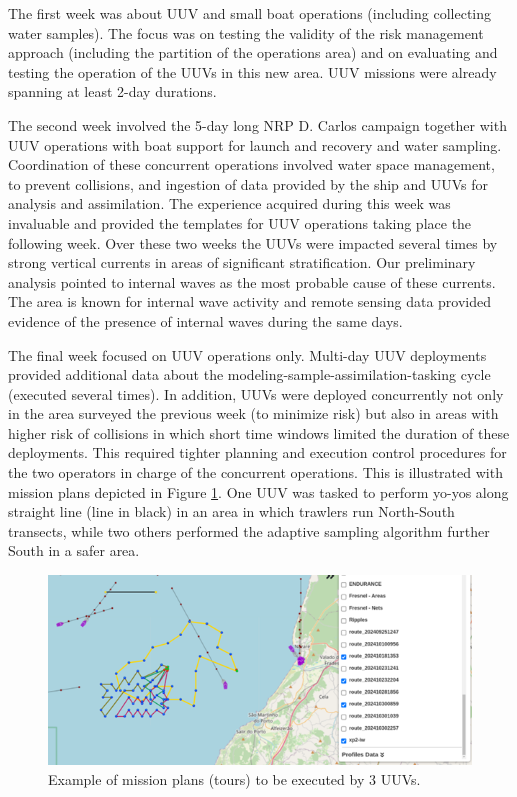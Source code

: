 The first week was about UUV and small boat operations (including collecting water samples). The focus was on testing the validity of the risk management approach (including the partition of the operations area) and on evaluating and testing the operation of the UUVs in this new area. UUV missions were already spanning at least 2-day durations.

The second week involved the 5-day long NRP D. Carlos campaign together with UUV operations with boat support for launch and recovery and water sampling. Coordination of these concurrent operations involved water space management, to prevent collisions, and ingestion of data provided by the ship and UUVs for analysis and assimilation. The experience acquired during this week was invaluable and provided the templates for UUV operations taking place the following week. Over these two weeks the UUVs were impacted several times by strong vertical currents in areas of significant stratification. Our preliminary analysis pointed to internal waves as the most probable cause of these currents. The area is known for internal wave activity and remote sensing data provided evidence of the presence of internal waves during the same days. 

The final week focused on UUV operations only. Multi-day UUV deployments provided additional data about the modeling-sample-assimilation-tasking cycle (executed several times). In addition, UUVs were deployed concurrently not only in the area surveyed the previous week (to minimize risk) but also in areas with higher risk of collisions in which short time windows limited the duration of these deployments. This required tighter planning and execution control procedures for the two operators in charge of the concurrent operations. This is illustrated with mission plans depicted in Figure \ref{fig:missionplans}. One UUV was tasked to perform yo-yos along straight line (line in black) in an area in which trawlers run North-South transects, while two others performed the adaptive sampling algorithm further South in a safer area.
 
\begin{figure}
    \centering
    \includegraphics[width=.7\linewidth]{fig/missionplans.png}
    \caption{Example of mission plans (tours) to be executed by 3 UUVs.}
    \label{fig:missionplans}
\end{figure}


